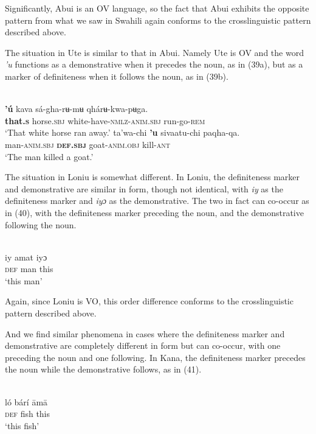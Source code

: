 \documentclass[output=paper]{langsci/langscibook}
\begin{document}
Significantly, Abui is an OV language, so the fact that Abui exhibits the opposite pattern from what we saw in Swahili again conforms to the crosslinguistic pattern described above.

The situation in Ute is similar to that in Abui. Namely Ute is OV and the word \textit{'u} functions as a demonstrative when it precedes the noun, as in (39a), but as a marker of definiteness when it follows the noun, as in (39b).

\ea\label{ex:dryer:}
\\
\ea
\gll     \textbf{'ú}  kava  sá-gha-rʉ-mʉ  qhárʉ-kwa-pʉga.\\
         \textbf{that.\textsc{s}}  horse.\textsc{sbj}  white-have-\textsc{nmlz-anim.sbj}  run-go-\textsc{rem}\\
\glt     ‘That white horse ran away.’
\ex
\gll    ta'wa-chi  \textbf{'u}  sivaatu-chi  paqha-qa.\\
         man-\textsc{anim.sbj}  \textbf{\textsc{def.sbj}}  goat-\textsc{anim.obj}  kill-\textsc{ant}\\
\glt     ‘The man killed a goat.’
\z
\z

The situation in Loniu is somewhat different. In Loniu, the definiteness marker and demonstrative are similar in form, though not identical, with \textit{iy} as the definiteness marker and \textit{iyɔ} as the demonstrative. The two in fact can co-occur as in (40), with the definiteness marker preceding the noun, and the demonstrative following the noun.

\ea\label{ex:dryer:}
\\
\gll   iy   amat   iyɔ\\
       \textsc{def}   man   this \\
\glt   ‘this man’
\z

Again, since Loniu is VO, this order difference conforms to the crosslinguistic pattern described above.

And we find similar phenomena in cases where the definiteness marker and demonstrative are completely different in form but can co-occur, with one preceding the noun and one following. In Kana, the definiteness marker precedes the noun while the demonstrative follows, as in (41).

\ea\label{ex:dryer:}
\\
\gll   ló   bárí   āmā \\
       \textsc{def}   fish   this \\
\glt   ‘this fish’
\z
\end{document}
